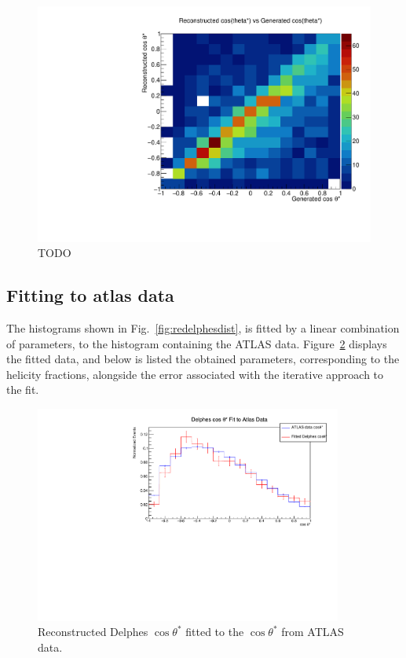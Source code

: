 \documentclass[12pt,a4paper]{article}
\numberwithin{equation}{section}
\begin{document}
\begin{figure}[H]
  \centering
  \includegraphics[width=0.6\linewidth]{figures/2dhist}
  \caption{\label{fig:2dhist} TODO}
\end{figure}

\subsection{Fitting to atlas data}
The histograms shown in Fig.~\ref{fig:redelphesdist}, is fitted by a linear
combination of parameters, to the histogram containing the ATLAS data.
Figure~\ref{fig:delphesfit} displays the fitted data, and below is listed the
obtained parameters, corresponding to the helicity fractions, alongside the
error associated with the iterative approach to the fit.

\begin{figure}[H]
  \centering
  \includegraphics[width=0.9\textwidth]{figures/delphes_fit}
  \caption{\label{fig:delphesfit}Reconstructed Delphes $\cos \theta^{*}$ fitted to
    the $\cos \theta^{*}$ from ATLAS data.}
\end{figure}
\end{document}
